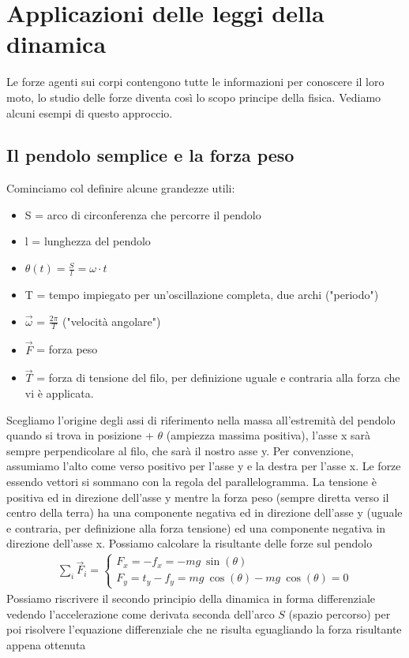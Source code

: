 \section{Applicazioni delle leggi della dinamica}
Le forze agenti sui corpi contengono tutte le informazioni per conoscere il loro moto, lo studio delle forze diventa così lo scopo principe della fisica. Vediamo alcuni esempi di questo approccio.
\subsection{Il pendolo semplice e la forza peso} \label{sec:pendulum}
Cominciamo col definire alcune grandezze utili:
\begin{itemize}
\item S = arco di circonferenza che percorre il pendolo
\item l = lunghezza del pendolo
\item $\theta(t) = \frac{S}{l} = \omega \cdot t$
\item T = tempo impiegato per un'oscillazione completa, due archi ("periodo")
\item $\vec{\omega}$ = $\frac{2 \pi}{T}$ ("velocità angolare")
\item $\vec{F}$ = forza peso
\item $\vec{T}$ = forza di tensione del filo, per definizione uguale e contraria alla forza che vi è applicata.
\end{itemize}
Scegliamo l'origine degli assi di riferimento nella massa all'estremità del pendolo quando si trova in posizione + $\theta$ (ampiezza massima positiva), l'asse x sarà sempre perpendicolare al filo, che sarà il nostro asse y. Per convenzione, assumiamo l'alto come verso positivo per l'asse y e la destra per l'asse x. Le forze essendo vettori si sommano con la regola del parallelogramma. La tensione è positiva ed in direzione dell'asse y mentre la forza peso (sempre diretta verso il centro della terra) ha una componente negativa ed in direzione dell'asse y (uguale e contraria, per definizione alla forza tensione) ed una componente negativa in direzione dell'asse x. Possiamo calcolare la risultante delle forze sul pendolo
\begin{align*}
	\sum_{i} \vec{F}_i = 
	\begin{cases}
		F_x = -f_x = - mg\ \sin(\theta)\\
		F_y = t_y -f_y = mg\ \cos(\theta) - mg\ \cos(\theta) = 0
	\end{cases}
\end{align*}
Possiamo riscrivere il secondo principio della dinamica in forma differenziale vedendo l'accelerazione come derivata seconda dell'arco $S$ (spazio percorso) per poi risolvere l'equazione differenziale che ne risulta eguagliando la forza risultante appena ottenuta
